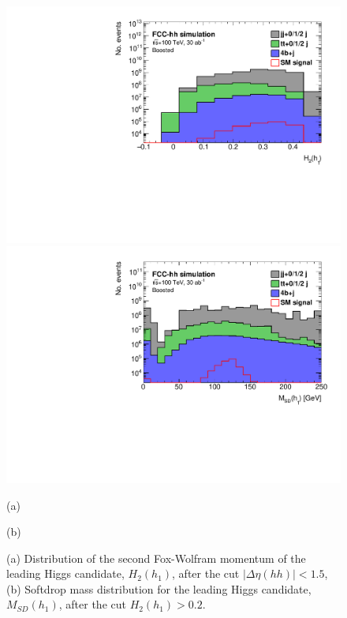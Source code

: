 \begin{figure}
	\centering
	\begin{minipage}{.5\textwidth}
		\centering
		\includegraphics[width=\linewidth]{./images/hist_h1_FW2_stack.pdf}
	\end{minipage}%
	\begin{minipage}{.5\textwidth}
		\centering
		\includegraphics[width=\linewidth]{./images/hist_h1_softdrop_M_stack.pdf}
	\end{minipage}
	\begin{minipage}[t]{0.5\textwidth}
		\caption*{(a)}
	\end{minipage}%
	\hfill
	\begin{minipage}[t]{0.5\textwidth}
		\caption*{(b)}
	\end{minipage}
	\caption{(a) Distribution of the second Fox-Wolfram momentum of the leading Higgs candidate, $H_2(h_1)$, after the cut $|\Delta\eta(hh)|<1.5$, (b) Softdrop mass distribution for the leading Higgs candidate, $M_{SD}(h_1)$, after the cut $H_2(h_1)>0.2$.}
	\label{fig:M_stack}
\end{figure}

%


